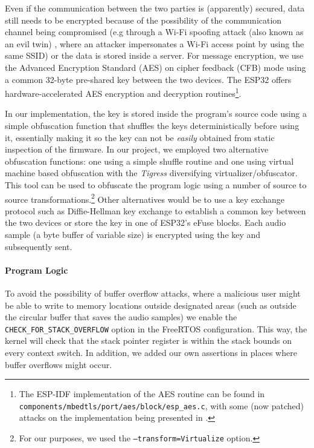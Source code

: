 \documentclass[conference]{IEEEtran}
\begin{document}
Even if the communication between the two parties is (apparently) secured, data still needs to be encrypted because of the possibility 
of the communication channel being compromised (e.g through a Wi-Fi spoofing attack (also known as an evil twin) \cite{WifiSpoofing}, where an attacker 
impersonates a Wi-Fi access point by using the same SSID) or the data is stored inside a server.
For message encryption, we use the Advanced Encryption Standard (AES) on cipher feedback (CFB) mode using 
a common 32-byte pre-shared key between the two devices.
The ESP32 offers hardware-accelerated AES encryption and decryption routines\footnote{The ESP-IDF implementation of the AES routine can be found in \texttt{components/mbedtls/port/aes/block/esp\_aes.c},
with some (now patched) attacks on the implementation being presented in \cite{PwnEsp32Crypto}.}.

In our implementation, the key is stored inside the program's source code using 
a simple obfuscation function that shuffles the keys deterministically before using it, essentially
making it so the key can not be \textit{easily} obtained from static inspection of the firmware.
In our project, we employed two alternative obfuscation functions: one 
using a simple shuffle routine and one using
virtual machine based obfuscation\cite{VMObfuscation} with the \textit{Tigress}\cite{Tigress} diversifying virtualizer/obfuscator.
This tool can be used to obfuscate the program logic using 
a number of source to source transformations.\footnote{For our purposes, we used the \texttt{--transform=Virtualize} option.}
Other alternatives would be to use a key exchange protocol such as Diffie-Hellman key exchange\cite{DiffieHellmanKeyExchange} to 
establish a common key between the two devices or store the key in one of ESP32's eFuse blocks.
Each audio sample (a byte buffer of variable size) is encrypted using the key 
and subsequently sent.

\paragraph{Program Logic}

To avoid the possibility of buffer overflow attacks, where a malicious user might be able 
to write to memory locations outside designated areas (such as outside the circular buffer that saves
the audio samples) we enable the \texttt{CHECK\_FOR\_STACK\_OVERFLOW} option in the FreeRTOS configuration.
This way, the kernel will check that the stack pointer register is within the stack bounds on every context switch.
In addition, we added our own assertions in places where buffer overflows might occur.
\end{document}
